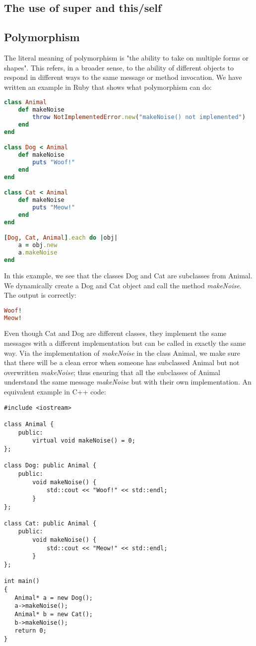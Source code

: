 \documentclass[10pt,a4paper,twocolumn]{article}
\begin{document}
\subsection{The use of super and this/self}

\subsection{Polymorphism}
The literal meaning of polymorphism is "the ability to take on multiple forms or shapes". This refers, in a broader sense, to the ability of different objects to respond in different ways to the same message or method invocation. We have written an example in Ruby that shows what polymorphism can do:

\begin{lstlisting}[language=Ruby]
class Animal
	def makeNoise
		throw NotImplementedError.new("makeNoise() not implemented")
	end
end

class Dog < Animal
	def makeNoise
		puts "Woof!"
	end
end

class Cat < Animal
	def makeNoise
		puts "Meow!"
	end
end

[Dog, Cat, Animal].each do |obj|
	a = obj.new
	a.makeNoise
end
\end{lstlisting}

In this example, we see that the classes Dog and Cat are subclasses from Animal. We dynamically create a Dog and Cat object and call the method \textit{makeNoise}. The output is correctly:

\begin{lstlisting}[language=Ruby]
Woof!
Meow!
\end{lstlisting}

Even though Cat and Dog are different classes, they implement the same messages with a different implementation but can be called in exactly the same way. Via the implementation of \textit{makeNoise} in the class Animal, we make sure that there will be a clean error when someone has subclassed Animal but not overwritten \textit{makeNoise}; thus ensuring that all the subclasses of Animal understand the same message \textit{makeNoise} but with their own implementation. An equivalent example in C++ code:

\begin{lstlisting}
#include <iostream>

class Animal {
	public:
		virtual void makeNoise() = 0;
};

class Dog: public Animal {
	public:
		void makeNoise() {
			std::cout << "Woof!" << std::endl;
		}
};

class Cat: public Animal {
	public:
		void makeNoise() {
			std::cout << "Meow!" << std::endl;
		}
};
 
int main()
{
   Animal* a = new Dog();
   a->makeNoise();
   Animal* b = new Cat();
   b->makeNoise();
   return 0;
}
\end{lstlisting}
\end{document}
